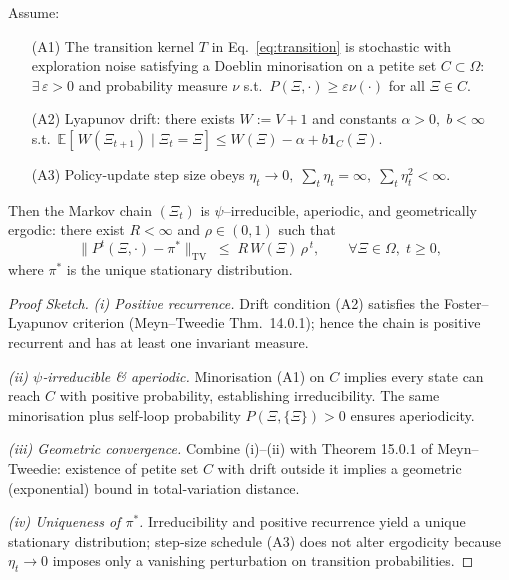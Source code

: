 \begin{theorem}
\label{thm:ergodic-full}
Assume:
\begin{enumerate}
\item[(A1)] The transition kernel $T$ in Eq.~\eqref{eq:transition}
      is stochastic with exploration noise satisfying
      a Doeblin minorisation on a petite set $C\subset\Omega$:
      $\exists\,\varepsilon>0$ and probability measure $\nu$
      s.t.\ $P(\Xi,\cdot)\ge\varepsilon\nu(\cdot)$ for all $\Xi\in C$.
\item[(A2)]  Lyapunov drift: there exists
      $W:=V+1$ and constants $\alpha>0,\;b<\infty$ s.t.\
      $\mathbb{E}[\,W(\Xi_{t+1})\mid\Xi_t=\Xi]\le
       W(\Xi)-\alpha+b\mathbf 1_{C}(\Xi).$
\item[(A3)]  Policy-update step size obeys
      $\eta_t\!\to\!0,\;
       \sum_t\eta_t=\infty,\;
       \sum_t\eta_t^{2}<\infty$.
\end{enumerate}
Then the Markov chain $(\Xi_t)$ is $\psi$--irreducible, aperiodic,
and geometrically ergodic:
there exist $R<\infty$ and $\rho\in(0,1)$ such that
\[
  \bigl\|P^t(\Xi,\cdot)-\pi^\ast\bigr\|_{\mathrm{TV}}
  \;\le\; R\,W(\Xi)\,\rho^{\,t},
  \qquad
  \forall \Xi\in\Omega,\; t\ge0,
\]
where $\pi^\ast$ is the unique stationary distribution.
\end{theorem}

\begin{proof}[Proof Sketch]
\emph{(i)  Positive recurrence.}  
Drift condition (A2) satisfies the Foster–Lyapunov criterion
(Meyn--Tweedie Thm.~14.0.1); hence the chain is positive recurrent
and has at least one invariant measure.

\smallskip\noindent
\emph{(ii)  $\psi$‐irreducible \& aperiodic.}  
Minorisation (A1) on $C$ implies every state can reach $C$
with positive probability, establishing irreducibility.
The same minorisation plus self‐loop probability $P(\Xi,\{\Xi\})>0$
ensures aperiodicity.

\smallskip\noindent
\emph{(iii)  Geometric convergence.}  
Combine (i)–(ii) with Theorem 15.0.1 of Meyn–Tweedie:
existence of petite set $C$ with drift outside it
implies a geometric (exponential) bound in total‐variation distance.

\smallskip\noindent
\emph{(iv)  Uniqueness of $\pi^\ast$.}  
Irreducibility and positive recurrence yield
a unique stationary distribution; step‐size schedule (A3)
does not alter ergodicity because $\eta_t\to0$
imposes only a vanishing perturbation on transition probabilities.
\end{proof}


